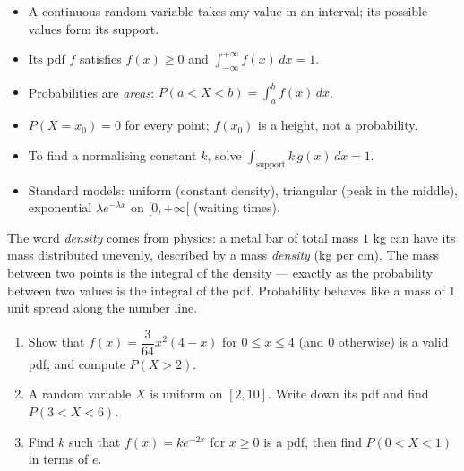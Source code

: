 \documentclass[11pt]{article}
\newcommand{\cle}[1]{{\popxbold\color{popdark}#1}}
\begin{document}
\begin{aretenir}
\begin{itemize}
\item A \cle{continuous random variable} takes any value in an interval; its possible values form its \cle{support}.
\item Its \cle{pdf} $f$ satisfies $f(x) \ge 0$ and $\displaystyle\int_{-\infty}^{+\infty} f(x)\,dx = 1$.
\item Probabilities are \emph{areas}: $P(a < X < b) = \displaystyle\int_a^b f(x)\,dx$.
\item $P(X = x_0) = 0$ for every point; $f(x_0)$ is a height, not a probability.
\item To find a normalising constant $k$, solve $\displaystyle\int_{\text{support}} k\,g(x)\,dx = 1$.
\item Standard models: uniform (constant density), triangular (peak in the middle), exponential $\lambda e^{-\lambda x}$ on $[0, +\infty[$ (waiting times).
\end{itemize}
\end{aretenir}

\begin{savaistu}
The word \emph{density} comes from physics: a metal bar of total mass $1$ kg can have its mass distributed unevenly, described by a mass \emph{density} (kg per cm). The mass between two points is the integral of the density — exactly as the probability between two values is the integral of the pdf. Probability behaves like a mass of $1$ unit spread along the number line.
\end{savaistu}

\begin{exercice}[Practice]
\begin{enumerate}
\item Show that $f(x) = \dfrac{3}{64}x^2(4 - x)$ for $0 \le x \le 4$ (and $0$ otherwise) is a valid pdf, and compute $P(X > 2)$.
\item A random variable $X$ is uniform on $[2, 10]$. Write down its pdf and find $P(3 < X < 6)$.
\item Find $k$ such that $f(x) = k e^{-2x}$ for $x \ge 0$ is a pdf, then find $P(0 < X < 1)$ in terms of $e$.
\end{enumerate}
\end{exercice}
\end{document}
